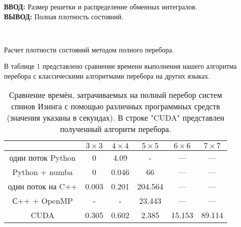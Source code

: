 \documentclass[10pt]{article}
\begin{document}
	\begin{algorithm}[H]
		\textbf{ВВОД:} Размер решетки и распределение обменных интегралов.\\
		\textbf{ВЫВОД:} Полная плотность состояний.
		\begin{algorithmic}
			{
				{
					{
					}
					\ENDFOR\\
				}
				\ENDFOR
			}
			\ENDFOR
		\end{algorithmic}
		\caption{Расчет плотности состояний методом полного перебора.}
		\label{algo:dos_exhaustive}
	\end{algorithm}
	
	В таблице 1 представлено сравнение времени выполнения нашего алгоритма перебора с классическими алгоритмами перебора на других языках.
	
	\begin{table}[h]
		\begin{center}
			\label{Time_Table}
			\caption{Сравнение времён, затрачиваемых на полный перебор систем спинов Изинга с помощью различных программных средств (значения указаны в секундах). В строке "CUDA" представлен полученный алгоритм перебора.}
			\begin{tabular}{|c|c|c|c|c|c|}
				\hline
				& $3 \times 3$ & $4 \times 4$ & $5 \times 5$ & $6 \times 6$ & $7 \times 7$  \\ \hline
				один поток Python & 0            & 4.09         & -            & ---          & ---           \\ \hline
				Python + numba    & 0            & 0.046        & 66           & ---          & ---           \\ \hline
				один поток на C++ & 0.003        & 0.201        & 204.564      & ---          & ---           \\ \hline
				С++ + OpenMP      & -            & -            & 23.443       & ---          & ---           \\ \hline
				CUDA              & 0.305        & 0.602        & 2.385        & 15.153       & 89.114        \\ \hline
			\end{tabular}
		\end{center}
	\end{table}
	
\end{document}
